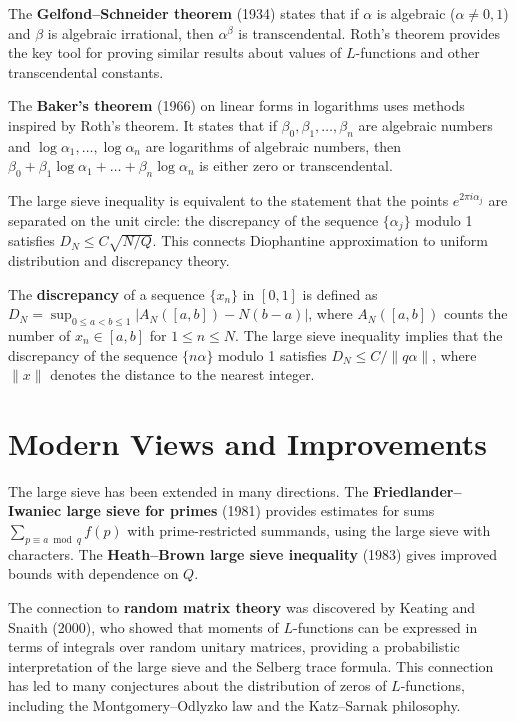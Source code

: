 The \textbf{Gelfond--Schneider theorem} (1934) states that if $\alpha$ is
algebraic ($\alpha \neq 0,1$) and $\beta$ is algebraic irrational, then
$\alpha^\beta$ is transcendental. Roth's theorem provides the key tool for
proving similar results about values of $L$-functions and other transcendental
constants.

The \textbf{Baker's theorem} (1966) on linear forms in logarithms uses
methods inspired by Roth's theorem. It states that if $\beta_0, \beta_1, \ldots,
\beta_n$ are algebraic numbers and $\log \alpha_1, \ldots, \log \alpha_n$
are logarithms of algebraic numbers, then $\beta_0 + \beta_1 \log \alpha_1 +
\ldots + \beta_n \log \alpha_n$ is either zero or transcendental.

The large sieve inequality is equivalent to the statement that the points
$e^{2\pi i \alpha_j}$ are separated on the unit circle: the discrepancy of the
sequence $\{\alpha_j\}$ modulo 1 satisfies $D_N \leq C \sqrt{N/Q}$. This
connects Diophantine approximation to uniform distribution and discrepancy
theory.

The \textbf{discrepancy} of a sequence $\{x_n\}$ in $[0,1]$ is defined as
$D_N = \sup_{0 \leq a < b \leq 1} |A_N([a,b]) - N(b-a)|$, where $A_N([a,b])$
counts the number of $x_n \in [a,b]$ for $1 \leq n \leq N$. The large sieve
inequality implies that the discrepancy of the sequence $\{n\alpha\}$ modulo 1
satisfies $D_N \leq C/\|q\alpha\|$, where $\|x\|$ denotes the distance to the
nearest integer.

\section{Modern Views and Improvements}

The large sieve has been extended in many directions. The \textbf{Friedlander--
Iwaniec large sieve for primes} (1981) provides estimates for sums
$\sum_{p \equiv a \bmod q} f(p)$ with prime-restricted summands, using the
large sieve with characters. The \textbf{Heath--Brown large sieve inequality}
(1983) gives improved bounds with dependence on $Q$.

The connection to \textbf{random matrix theory} was discovered by Keating and
Snaith (2000), who showed that moments of $L$-functions can be expressed in
terms of integrals over random unitary matrices, providing a probabilistic
interpretation of the large sieve and the Selberg trace formula. This
connection has led to many conjectures about the distribution of zeros of
$L$-functions, including the Montgomery--Odlyzko law and the Katz--Sarnak
philosophy.

